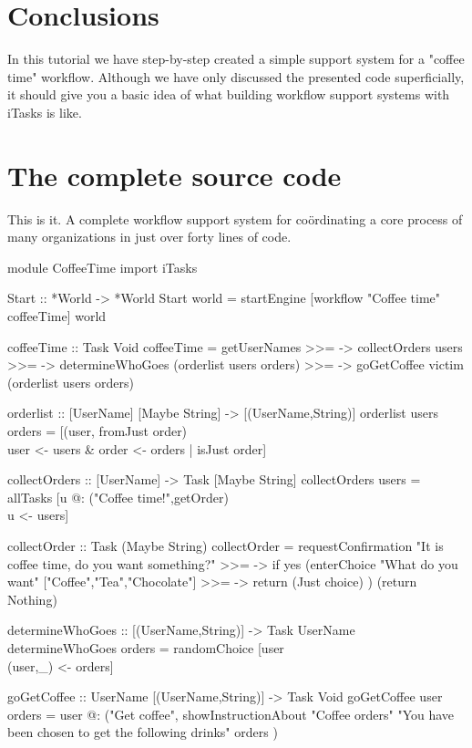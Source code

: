 \documentclass[a4paper,11pt]{article}
\begin{document}
\section{Conclusions}
In this tutorial we have step-by-step created a simple support system for a "coffee time" workflow. Although we have only discussed the presented code superficially, it should give you a basic idea of what  building workflow support systems with iTasks is like.
\appendix
\newpage
\section{The complete source code}
This is it. A complete workflow support system for co\"ordinating a core process of many organizations in just over forty lines of code.
\begin{CleanCodeN}
module CoffeeTime
import iTasks

Start :: *World -> *World
Start world = startEngine [workflow "Coffee time" coffeeTime] world

coffeeTime :: Task Void
coffeeTime
    =   getUserNames
    >>= \users ->
        collectOrders users 
    >>= \orders ->
        determineWhoGoes (orderlist users orders)
    >>= \victim ->
        goGetCoffee victim (orderlist users orders)

orderlist :: [UserName] [Maybe String] -> [(UserName,String)]
orderlist users orders
 = [(user, fromJust order) \\ user <- users & order <- orders | isJust order]

collectOrders :: [UserName] -> Task [Maybe String] 
collectOrders users = allTasks [u @: ("Coffee time!",getOrder) \\ u <- users]

collectOrder :: Task (Maybe String)
collectOrder
    =   requestConfirmation "It is coffee time, do you want something?"
    >>= \yes -> if yes
        (enterChoice "What do you want" ["Coffee","Tea","Chocolate"]
         >>= \choice -> return (Just choice)
        )
        (return Nothing)

determineWhoGoes :: [(UserName,String)] -> Task UserName
determineWhoGoes orders = randomChoice [user \\ (user,_) <- orders]

goGetCoffee :: UserName [(UserName,String)] -> Task Void
goGetCoffee user orders
    = user @:
     ("Get coffee", showInstructionAbout
                        "Coffee orders" 
                        "You have been chosen to get the following drinks" 
                        orders
     )

\end{CleanCodeN}
\end{document}
